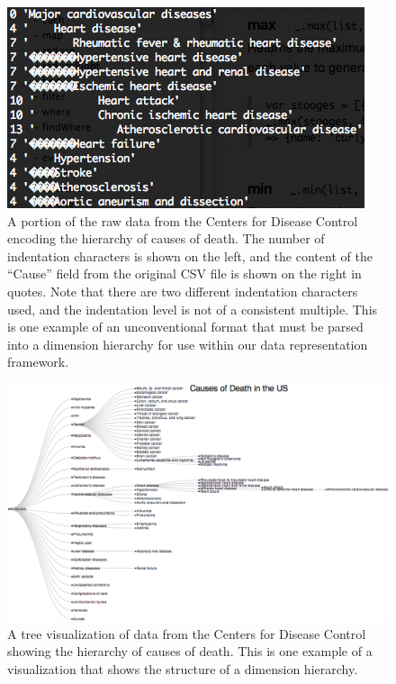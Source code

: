 \begin{figure}
  \centering
  \includegraphics[width=\figureWidth]{figs/cardiovascularDiseaseRawTree.png}
  \caption[Cardiovascular disease raw tree.]
   {A portion of the raw data from the Centers for Disease Control encoding the hierarchy of causes of death. The number of indentation characters is shown on the left, and the content of the ``Cause'' field from the original CSV file is shown on the right in quotes. Note that there are two different indentation characters used, and the indentation level is not of a consistent multiple. This is one example of an unconventional format that must be parsed into a dimension hierarchy for use within our data representation framework.}
  \label{fig:cardiovascularDiseaseRawTree}
\end{figure}

\begin{figure}
  \centering
  \includegraphics[width=\figureWidth]{figs/mortalityVisTree.png}
  \caption[Cause of Death Tree Visualization.]
   {A tree visualization of data from the Centers for Disease Control showing the hierarchy of causes of death. This is one example of a visualization that shows the structure of a dimension hierarchy.}
  \label{fig:mortalityVisTree}
\end{figure}

